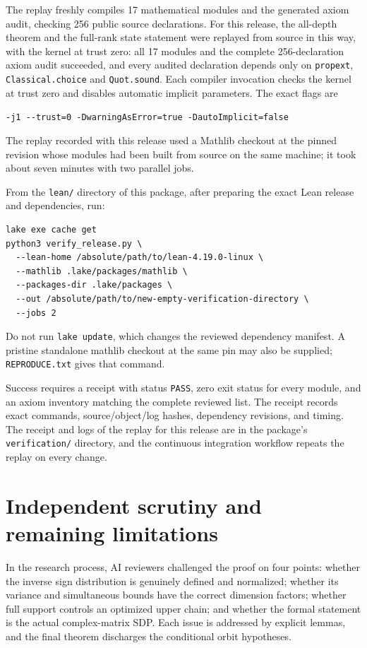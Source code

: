 \documentclass[11pt]{article}
\begin{document}
The replay freshly compiles 17 mathematical modules and
the generated axiom audit, checking 256 public source declarations.
For this release, the all-depth theorem and the full-rank state statement
were replayed from source in this way, with the kernel at trust zero: all 17 modules and the complete 256-declaration
axiom audit succeeded, and every audited declaration depends only on
\texttt{propext}, \texttt{Classical.choice} and \texttt{Quot.sound}.
Each compiler invocation checks the kernel at trust zero and disables
automatic implicit parameters. The exact flags are
\begin{center}\small\verb|-j1 --trust=0 -DwarningAsError=true -DautoImplicit=false|\end{center}
The replay recorded with this release used a Mathlib checkout at the
pinned revision whose modules had been built from source on the same machine;
it took about seven minutes with two parallel jobs.

\begin{minipage}{\textwidth}
From the \texttt{lean/} directory of this package, after preparing the exact
Lean release and dependencies, run:
\begin{verbatim}
lake exe cache get
python3 verify_release.py \
  --lean-home /absolute/path/to/lean-4.19.0-linux \
  --mathlib .lake/packages/mathlib \
  --packages-dir .lake/packages \
  --out /absolute/path/to/new-empty-verification-directory \
  --jobs 2
\end{verbatim}
\end{minipage}

Do not run \texttt{lake update}, which changes the reviewed dependency
manifest. A pristine standalone mathlib checkout at the same pin may also
be supplied; \texttt{REPRODUCE.txt} gives that command.

Success requires a receipt with status \texttt{PASS}, zero exit status for
every module, and an axiom inventory matching the complete reviewed list.
The receipt records exact commands, source/object/log hashes, dependency
revisions, and timing. The receipt and logs of the replay for this release are
in the package's \texttt{verification/} directory, and the continuous
integration workflow repeats the replay on every change.

\section{Independent scrutiny and remaining limitations}\label{sec:limits}
In the research process, AI reviewers challenged the proof on four points: whether the inverse
sign distribution is genuinely defined and normalized; whether its variance
and simultaneous bounds have the correct dimension factors; whether full
support controls an optimized upper chain; and whether the formal statement
is the actual complex-matrix SDP. Each issue is addressed by explicit
lemmas, and the final theorem discharges the conditional orbit hypotheses.
\end{document}
